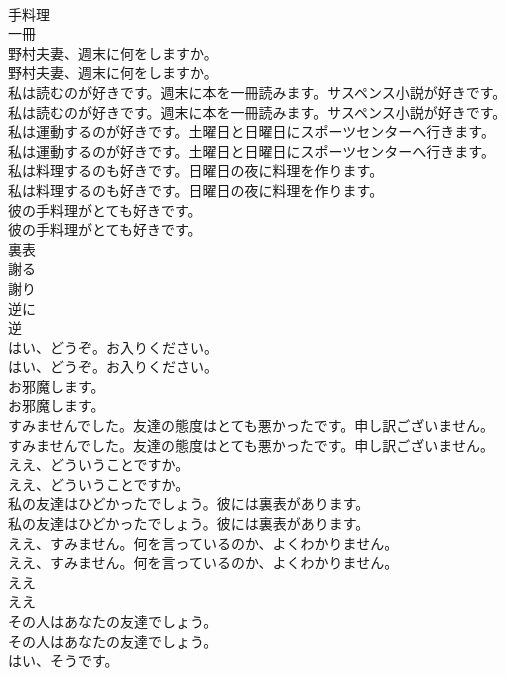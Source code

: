 \documentclass[8pt]{extreport}
\begin{document}
\begin{CJK}{UTF8}{min}
\\	手料理
\\	一冊
\\	野村夫妻、週末に何をしますか。	
\\	野村夫妻、週末に何をしますか。 
\\	私は読むのが好きです。週末に本を一冊読みます。サスペンス小説が好きです。	
\\	私は読むのが好きです。週末に本を一冊読みます。サスペンス小説が好きです。 
\\	私は運動するのが好きです。土曜日と日曜日にスポーツセンターへ行きます。	
\\	私は運動するのが好きです。土曜日と日曜日にスポーツセンターへ行きます。 
\\	私は料理するのも好きです。日曜日の夜に料理を作ります。	
\\	私は料理するのも好きです。日曜日の夜に料理を作ります。 
\\	彼の手料理がとても好きです。	
\\	彼の手料理がとても好きです。 
\\	裏表
\\	謝る
\\	謝り
\\	逆に
\\	逆
\\	はい、どうぞ。お入りください。	
\\	はい、どうぞ。お入りください。 
\\	お邪魔します。	
\\	お邪魔します。 
\\	すみませんでした。友達の態度はとても悪かったです。申し訳ございません。	
\\	すみませんでした。友達の態度はとても悪かったです。申し訳ございません。 
\\	ええ、どういうことですか。	
\\	ええ、どういうことですか。 
\\	私の友達はひどかったでしょう。彼には裏表があります。	
\\	私の友達はひどかったでしょう。彼には裏表があります。 
\\	ええ、すみません。何を言っているのか、よくわかりません。	
\\	ええ、すみません。何を言っているのか、よくわかりません。 
\\	ええ
\\	ええ
\\	その人はあなたの友達でしょう。	
\\	その人はあなたの友達でしょう。 
\\	はい、そうです。	

\end{CJK}
\end{document}
